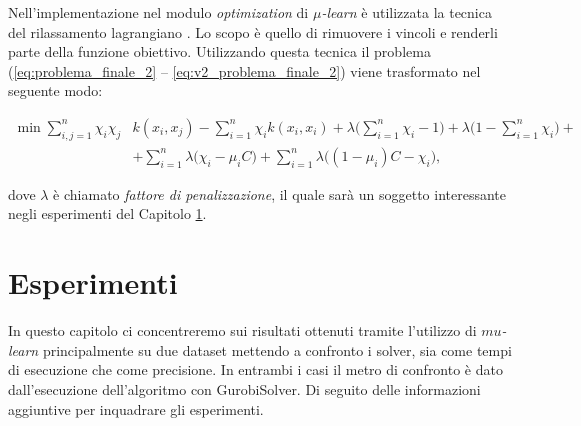 \documentclass[a4paper,12pt]{report}
\begin{document}
Nell'implementazione nel modulo \textit{optimization} di \textit{$\mu$-learn} \cite{mulearn_documentation} è utilizzata la tecnica del rilassamento lagrangiano \cite{lagrangian_relaxation}. Lo scopo è quello di rimuovere i vincoli e renderli parte della funzione obiettivo. Utilizzando questa tecnica il problema (\ref{eq:problema_finale_2} -- \ref{eq:v2_problema_finale_2}) viene trasformato nel seguente modo:

\begin{equation*}
    \begin{split}
        \min \displaystyle\sum_{i,j=1}^{n}\chi_i\chi_j &k(x_i,x_j) - \displaystyle\sum_{i=1}^{n}\chi_ik(x_i,x_i)+ \lambda\Big(\displaystyle\sum_{i=1}^{n}\chi_i -1\Big) + \lambda\Big(1 - \displaystyle\sum_{i=1}^{n}\chi_i\Big) + \\
        &+ \displaystyle\sum_{i=1}^{n}\lambda\Big(\chi_i-\mu_iC\Big) + \displaystyle\sum_{i=1}^{n}\lambda\Big((1 -\mu_i)C - \chi_i\Big),       
    \end{split}
\end{equation*}

\noindent dove $\lambda$ è chiamato \textit{fattore di penalizzazione}, il quale sarà un soggetto interessante negli esperimenti del Capitolo \ref{Captiolo 3}.



%

\chapter{Esperimenti}
\label{Captiolo 3}
In questo capitolo ci concentreremo sui risultati ottenuti tramite l'utilizzo di \textit{$mu$-learn} principalmente su due dataset mettendo a confronto i solver, sia come tempi di esecuzione che come precisione. In entrambi i casi il metro di confronto è dato dall'esecuzione dell'algoritmo con GurobiSolver. Di seguito delle informazioni aggiuntive per inquadrare gli esperimenti.

\end{document}
